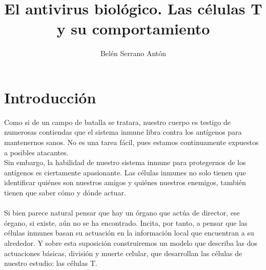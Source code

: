 \documentclass{article}
\title{	\xout{¿Cómo nos defendemos de los patógenos?} El antivirus biológico. Las células T y su comportamiento}
\author{Belén Serrano Antón }
\begin{document}
	
	\begin{titlepage}
		\maketitle
	\end{titlepage}
	
	\section{Introducción}
	
	Como si de un campo de batalla se tratara, nuestro cuerpo es testigo de numerosas contiendas que el sistema inmune libra contra los antígenos para mantenernos sanos. No es una tarea fácil, pues estamos continuamente expuestos a posibles atacantes.
	\\
	Sin embargo, la habilidad de nuestro sistema inmune para protegernos de los antígenos es ciertamente apasionante. Las células inmunes no solo tienen que identificar quiénes son nuestros amigos y quiénes nuestros enemigos, también tienen que saber cómo y dónde actuar.
	\\
	\\
	Si bien parece natural pensar que hay un órgano que actúa de director, ese órgano, si existe, aún no se ha encontrado. Incita, por tanto, a pensar que las células inmunes basan su actuación en la información local que encuentran a su alrededor. Y sobre esta suposición construiremos un modelo que describa las dos actuaciones básicas, división y muerte celular, que desarrollan las células de nuestro estudio: las células T.
	
\end{document}
